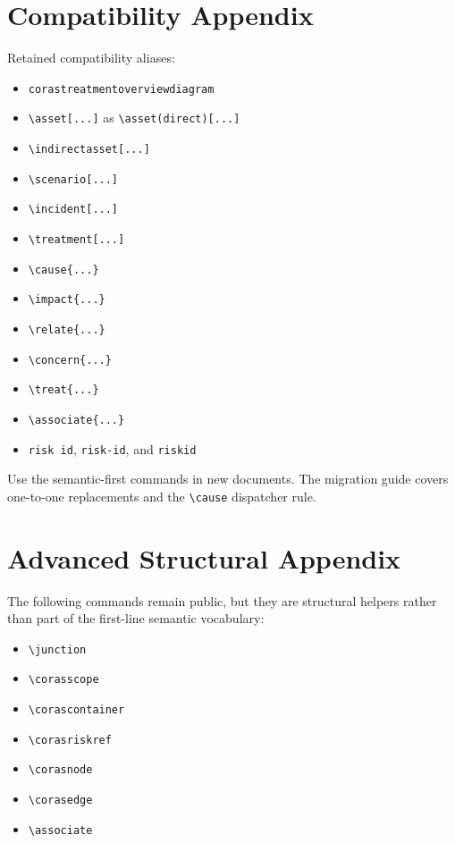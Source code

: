\documentclass[a4paper]{article}
\begin{document}
\section{Compatibility Appendix}

Retained compatibility aliases:

\begin{itemize}
  \item \texttt{corastreatmentoverviewdiagram}
  \item \texttt{\textbackslash asset[...]} as \texttt{\textbackslash asset(direct)[...]}
  \item \texttt{\textbackslash indirectasset[...]}
  \item \texttt{\textbackslash scenario[...]}
  \item \texttt{\textbackslash incident[...]}
  \item \texttt{\textbackslash treatment[...]}
  \item \texttt{\textbackslash cause\{...\}}
  \item \texttt{\textbackslash impact\{...\}}
  \item \texttt{\textbackslash relate\{...\}}
  \item \texttt{\textbackslash concern\{...\}}
  \item \texttt{\textbackslash treat\{...\}}
  \item \texttt{\textbackslash associate\{...\}}
  \item \texttt{risk id}, \texttt{risk-id}, and \texttt{riskid}
\end{itemize}

Use the semantic-first commands in new documents. The migration guide covers
one-to-one replacements and the \texttt{\textbackslash cause} dispatcher rule.

\section{Advanced Structural Appendix}

The following commands remain public, but they are structural helpers rather
than part of the first-line semantic vocabulary:

\begin{itemize}
  \item \texttt{\textbackslash junction}
  \item \texttt{\textbackslash corasscope}
  \item \texttt{\textbackslash corascontainer}
  \item \texttt{\textbackslash corasriskref}
  \item \texttt{\textbackslash corasnode}
  \item \texttt{\textbackslash corasedge}
  \item \texttt{\textbackslash associate}
\end{itemize}
\end{document}
